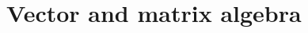 \documentclass[unknownkeysallowed]{beamer}\usepackage[]{graphicx}\usepackage[]{color}
\begin{document}







\section{Vector and matrix algebra}

\frame{\sectionpage}
\end{document}
